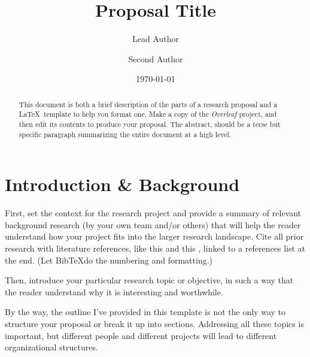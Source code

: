 \documentclass[%
 reprint,
 amsmath,amssymb,
 aps,
]{revtex4-2}
\begin{document}
\title{Proposal Title}%

\author{Lead Author} %
\author{Second Author} %
%

\date{\today}%

\begin{abstract}
This document is both a brief description of the parts of a research proposal and a \LaTeX\ template to help you format one. Make a copy of the \textit{Overleaf} project, and then edit its contents to produce your proposal. The abstract, should be a terse but specific paragraph summarizing the entire document at a high level.
\end{abstract}

\maketitle

\section{Introduction \& Background}

First, set the context for the research project and provide a summary of relevant background research (by your own team and/or others) that will help the reader understand how your project fits into the larger research landscape. Cite all prior research with literature references, like this \cite{feyn54} and this \cite{Beutler1994,witten2001,Bire82,epr}, linked to a references list at the end. (Let Bib\TeX do the numbering and formatting.)

Then, introduce your particular research topic or objective, in such a way that the reader understand why it is interesting and worthwhile.

By the way, the outline I've provided in this template is not the only way to structure your proposal or break it up into sections. Addressing all these topics is important, but different people and different projects will lead to different organizational structures.
\end{document}
